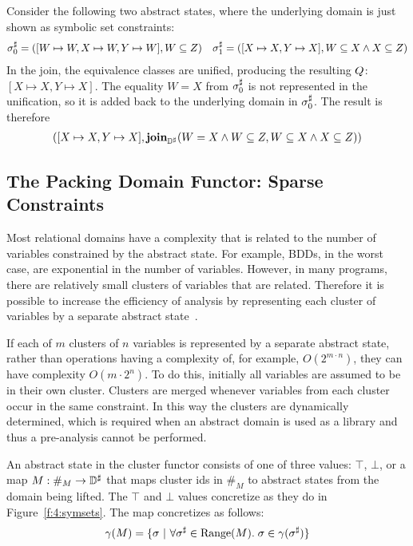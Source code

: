 \begin{example}
Consider the following two abstract states, where the underlying domain is just shown as symbolic set constraints:
\begin{align*}
  {\sigma}^{\sharp}_0 = ([W \mapsto W, X \mapsto W, Y \mapsto W], W \subseteq Z) \quad
  {\sigma}^{\sharp}_1 = ([X \mapsto X, Y \mapsto X], W \subseteq X \wedge X \subseteq Z)
\end{align*}
In the join, the equivalence classes are unified, producing the resulting $Q$: $[X \mapsto X, Y \mapsto X]$.  The equality $W = X$ from ${\sigma}^{\sharp}_0$ is not represented in the unification, so it is added back to the underlying domain in ${\sigma}^{\sharp}_0$.  The result is therefore
\begin{align*}
  ([X \mapsto X, Y \mapsto X], \textbf{join}_{{\mathbb{D}}^{\sharp}}(W = X \wedge W \subseteq Z, W \subseteq X \wedge X \subseteq Z))
\end{align*}
\end{example}

\subsection{The Packing Domain Functor: Sparse Constraints}
\label{s:4:5:packs}
Most relational domains have a complexity that is related to the number of variables constrained by the abstract state.  For example, BDDs, in the worst case, are exponential in the number of variables.  However, in many programs, there are relatively small clusters of variables that are related.  Therefore it is possible to increase the efficiency of analysis by representing each cluster of variables by a separate abstract state~\cite{ens:pldi:03}.

If each of $m$ clusters of $n$ variables is represented by a separate abstract state, rather than operations having a complexity of, for example, $O(2^{m\cdot n})$, they can have complexity $O(m\cdot 2^n)$.  To do this, initially all variables are assumed to be in their own cluster.  Clusters are merged whenever variables from each cluster occur in the same constraint.  In this way the clusters are dynamically determined, which is required when an abstract domain is used as a library and thus a pre-analysis cannot be performed.

An abstract state in the cluster functor consists of one of three values: $\top$, $\bot$, or a map $M : \#_M \rightarrow {\mathbb{D}}^{\sharp}$ that maps cluster ids in $\#_M$ to abstract states from the domain being lifted.  The $\top$ and $\bot$ values concretize as they do in Figure~\ref{f:4:symsets}.  The map concretizes as follows:
\begin{align*}
  \gamma(M) = \{ \sigma \ | \ \forall {\sigma}^{\sharp} \in \textrm{Range}(M). \; \sigma \in \gamma({\sigma}^{\sharp}) \}
\end{align*}


